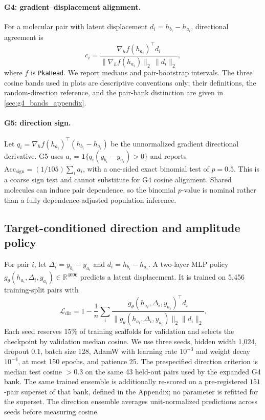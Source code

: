 \documentclass[11pt]{article}
\begin{document}
\paragraph{G4: gradient--displacement alignment.} For a molecular pair with latent displacement $d_i=h_{b_i}-h_{a_i}$, directional agreement is
\begin{equation}
  c_i = \frac{\nabla_h f(h_{a_i})^\top d_i}{\lVert\nabla_h f(h_{a_i})\rVert_2\,\lVert d_i\rVert_2},
\end{equation}
where $f$ is \texttt{PkaHead}. We report medians and pair-bootstrap intervals. The three cosine bands used in plots are descriptive conventions only; their definitions, the random-direction reference, and the pair-bank distinction are given in \cref{sec:g4_bands_appendix}.

\paragraph{G5: direction sign.} Let $q_i=\nabla_h f(h_{a_i})^\top(h_{b_i}-h_{a_i})$ be the unnormalized gradient directional derivative. G5 uses $a_i=\mathbf 1\{q_i(y_{b_i}-y_{a_i})>0\}$ and reports $\mathrm{Acc}_{\mathrm{sign}}=(1/105)\sum_i a_i$, with a one-sided exact binomial test of $p=0.5$. This is a coarse sign test and cannot substitute for G4 cosine alignment. Shared molecules can induce pair dependence, so the binomial $p$-value is nominal rather than a fully dependence-adjusted population inference.

\subsection{Target-conditioned direction and amplitude policy}
\label{sec:policy_methods}

For pair $i$, let $\Delta_i=y_{b_i}-y_{a_i}$ and $d_i=h_{b_i}-h_{a_i}$. A two-layer MLP policy $g_\theta(h_{a_i},\Delta_i,y_{a_i})\in\mathbb R^{4096}$ predicts a latent displacement. It is trained on 5{,}456 training-split pairs with
\begin{equation}
 \mathcal L_{\mathrm{dir}}=1-\frac1n\sum_i
 \frac{g_\theta(h_{a_i},\Delta_i,y_{a_i})^\top d_i}
 {\lVert g_\theta(h_{a_i},\Delta_i,y_{a_i})\rVert_2\lVert d_i\rVert_2}.
\end{equation}
Each seed reserves 15\% of training scaffolds for validation and selects the checkpoint by validation median cosine. We use three seeds, hidden width 1{,}024, dropout $0.1$, batch size 128, AdamW with learning rate $10^{-3}$ and weight decay $10^{-4}$, at most 150 epochs, and patience 25. The prespecified direction criterion is median test cosine $>0.3$ on the same 43 held-out pairs used by the expanded G4 bank. The same trained ensemble is additionally re-scored on a pre-registered $151$-pair superset of that bank, defined in the Appendix; no parameter is refitted for the superset. The direction ensemble averages unit-normalized predictions across seeds before measuring cosine.
\end{document}

